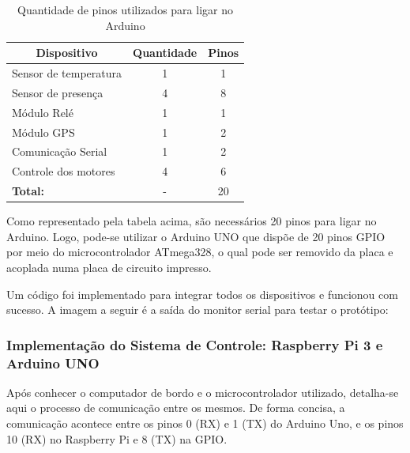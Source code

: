 \begin{table}[H]
\centering
\caption{Quantidade de pinos utilizados para ligar no Arduino}
\label{pinos_arduino}
\begin{tabular}{|l|c|c|}
\hline
\multicolumn{1}{|c|}{\textbf{Dispositivo}} & \multicolumn{1}{l|}{\textbf{Quantidade}} & \multicolumn{1}{l|}{\textbf{Pinos}} \\ \hline
Sensor de temperatura                      & 1                                        & 1                                   \\ \hline
Sensor de presença                         & 4                                        & 8                                   \\ \hline
Módulo Relé                                & 1                                        & 1                                   \\ \hline
Módulo GPS                                 & 1                                        & 2                                   \\ \hline
Comunicação Serial                         & 1                                        & 2                                   \\ \hline
Controle dos motores                       & 4                                        & 6                                   \\ \hline
\textbf{Total:}                            & -                                        & 20                                  \\ \hline
\end{tabular}
\end{table}

Como representado pela tabela acima, são necessários 20 pinos para ligar no Arduino. Logo, pode-se utilizar o Arduino UNO que dispõe de 20 pinos GPIO por meio do microcontrolador ATmega328, o qual pode ser removido da placa e acoplada numa placa de circuito impresso.

Um código foi implementado para integrar todos os dispositivos e funcionou com sucesso. A imagem a seguir é a saída do monitor serial para testar o protótipo:


\subsubsection{ Implementação do Sistema de Controle: Raspberry Pi 3 e Arduino UNO}

Após conhecer o computador de bordo e o microcontrolador utilizado, detalha-se aqui o processo de comunicação entre os mesmos. 
De forma concisa, a comunicação acontece entre os pinos  0 (RX) e 1 (TX) do Arduino Uno, e os pinos 10 (RX) no Raspberry Pi e 8 (TX) na GPIO. 

